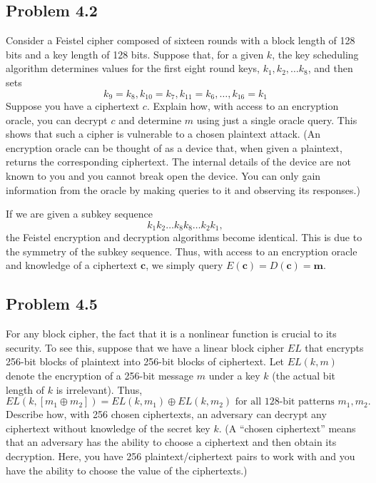 \documentclass[../hw_sols.tex]{subfiles}
\begin{document}
	
\subsection*{Problem 4.2}

Consider a Feistel cipher composed of sixteen rounds with a block length of 
128 bits and a key length of 128 bits. Suppose that, for a given $k$, the key 
scheduling algorithm determines values for the first eight round keys, 
$k_1, k_2, \dots k_8$, and then sets
	$$k_9 = k_8, k_{10} = k_7, k_{11} = k_6, \dots, k_{16} = k_1$$
Suppose you have a ciphertext $c$. Explain how, with access to an encryption 
oracle, you can decrypt $c$ and determine $m$ using just a single oracle query. 
This shows that such a cipher is vulnerable to a chosen plaintext attack. (An 
encryption oracle can be thought of as a device that, when given a plaintext, 
returns the corresponding ciphertext. The internal details of the device are 
not known to you and you cannot break open the device. You can only gain 
information from the oracle by making queries to it and observing its 
responses.)

\begin{solution}
If we are given a subkey sequence 
	$$k_1 k_2 \dots k_8 k_8 \dots k_2 k_1,$$ 
the Feistel encryption and decryption algorithms become identical. This is 
due to the symmetry of the subkey sequence. Thus, with access to an 
encryption oracle and knowledge of a ciphertext $\mathbf{c}$, we simply query 
$E(\mathbf{c}) = D(\mathbf{c}) = \mathbf{m}$.
\end{solution}


\newpage



\subsection*{Problem 4.5}

For any block cipher, the fact that it is a nonlinear function is crucial to 
its security. To see this, suppose that we have a linear block cipher $EL$ 
that encrypts 256-bit blocks of plaintext into 256-bit blocks of ciphertext. 
Let $EL(k, m)$ denote the encryption of a 256-bit message $m$ under a key $k$ 
(the actual bit length of $k$ is irrelevant). Thus,
	$$EL(k,[m_1 \oplus m_2]) = 
	EL(k,m_1) \oplus EL(k,m_2) \text{ for all 128-bit patterns } m_1,m_2.$$
Describe how, with 256 chosen ciphertexts, an adversary can decrypt any 
ciphertext without knowledge of the secret key $k$. (A “chosen ciphertext” 
means that an adversary has the ability to choose a ciphertext and then obtain 
its decryption. Here, you have 256 plaintext/ciphertext pairs to work with and 
you have the ability to choose the value of the ciphertexts.)
\end{document}
